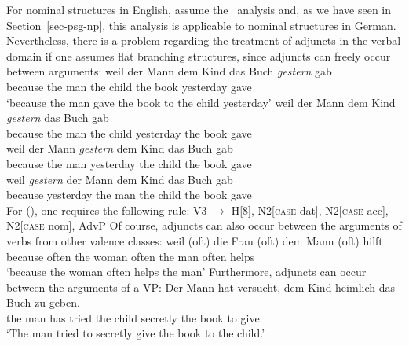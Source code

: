 For nominal structures in English, \citet[]{GKPS85a} assume the \xbar~analysis and, as we have seen in Section~\ref{sec-psg-np}, this analysis is applicable
to nominal structures in German. Nevertheless, there is a problem regarding the treatment of adjuncts in the verbal domain if one assumes flat branching structures, since adjuncts can
freely occur between arguments:
\eal
\ex 
\gll weil der Mann dem Kind das Buch \emph{gestern} gab\\
	 because the man the child the book yesterday gave\\
\glt `because the man gave the book to the child yesterday'
\ex 
\gll weil der Mann dem Kind \emph{gestern} das Buch gab\\
	 because the man the child yesterday the book gave\\
\ex 
\gll weil der Mann \emph{gestern} dem Kind das Buch gab\\
	 because the man yesterday the child the book gave\\
\ex 
\gll weil \emph{gestern} der Mann dem Kind das Buch gab\\
	 because yesterday the man the child the book gave\\
\zl
For (), one requires the following rule:
\ea
\label{regel-ditransitiv-adv}
V3  $\to$ H[8], N2[\textsc{case} dat], N2[\textsc{case} acc], N2[\textsc{case} nom], AdvP
\z
Of course, adjuncts can also occur between the arguments of verbs from other valence classes:
\ea
\gll weil (oft) die Frau (oft) dem Mann (oft) hilft\\
	because \spacebr{}often the woman \spacebr{}often the man \spacebr{}often helps\\
\glt `because the woman often helps the man'
\z
Furthermore, adjuncts can occur between the arguments of a VP:
\ea
\gll Der Mann hat versucht, dem Kind heimlich das Buch zu geben.\\
	the man has tried the child secretly the book to give\\
\glt `The man tried to secretly give the book to the child.'
\z 

